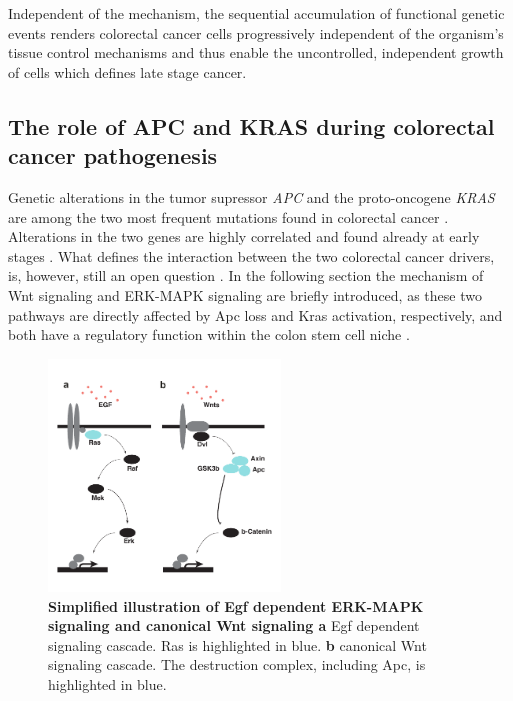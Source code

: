 \begin{flushleft}
Independent of the mechanism, the sequential accumulation of functional genetic events renders colorectal cancer cells progressively independent of the organism's tissue control mechanisms and thus enable the uncontrolled, independent growth of cells which defines late stage cancer.

\subsection{The role of APC and KRAS during colorectal cancer pathogenesis}
Genetic alterations in the tumor supressor \textit{APC} and the proto-oncogene \textit{KRAS} are among the two most frequent mutations found in colorectal cancer \parencite{markowitzMolecularOriginsCancer2009}. Alterations in the two genes are highly correlated and found already at early stages \parencite{minaConditionalSelectionGenomic2017}. What defines the interaction between the two colorectal cancer drivers, is, however, still an open question \parencite{parsonsWNTDriverDependency2021}. In the following section the mechanism of Wnt signaling and ERK-MAPK signaling are briefly introduced, as these two pathways are directly affected by Apc loss and Kras activation, respectively, and both have a regulatory function within the colon stem cell niche \parencite{hTalesCryptNew2019}.

\begin{figure}[h]
\centering
\includegraphics[width=0.55\textwidth,
                keepaspectratio]{figures/adenomaprofiling/pdf/fig_0_1.pdf}
\caption[Simplified illustration of ERK-MAPK signaling and canonical Wnt signaling]{\textbf{Simplified illustration of Egf dependent ERK-MAPK signaling and canonical Wnt signaling a} Egf dependent signaling cascade. Ras is highlighted in blue. \textbf{b} canonical Wnt signaling cascade. The destruction complex, including Apc, is highlighted in blue.}
\label{fig_180}
\end{figure}
\bigbreak


\end{flushleft}
